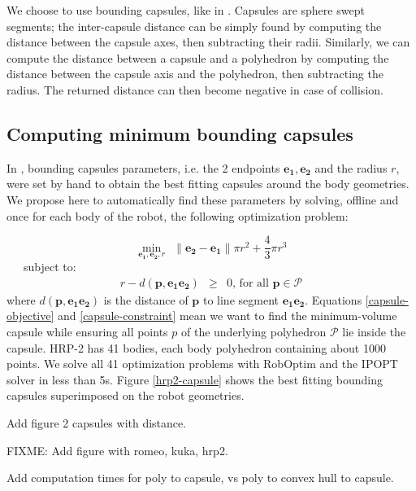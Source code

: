 We choose to use bounding capsules, like in
\cite{Kanoun2011}. Capsules are sphere swept segments; the
inter-capsule distance can be simply found by computing the distance
between the capsule axes, then subtracting their radii. Similarly, we
can compute the distance between a capsule and a polyhedron by
computing the distance between the capsule axis and the polyhedron,
then subtracting the radius. The returned distance can then become
negative in case of collision.

\subsection{Computing minimum bounding capsules}
In \cite{Kanoun2011}, bounding capsules parameters, i.e. the 2
endpoints $\mathbf{e_1}, \mathbf{e_2}$ and the radius $r$, were set by
hand to obtain the best fitting capsules around the body
geometries. We propose here to automatically find these parameters by
solving, offline and once for each body of the robot, the following
optimization problem:

\begin{equation}
  \min_{\mathbf{e_1}, \mathbf{e_2}, r} \ \ 
  \|\mathbf{e_2} - \mathbf{e_1}\| \pi r^2 + \frac{4}{3}\pi r^3
  \label{capsule-objective}
\end{equation}
\ \ \ subject to:
\begin{equation}
  \begin{array}{rcll}
    r - d(\mathbf{p},\mathbf{e_1e_2}) & \ge & 0\mbox{, for all }
    \mathbf{p} \in \mathcal{P}
    \label{capsule-constraint}
  \end{array}
\end{equation} 
where $d(\mathbf{p},\mathbf{e_1e_2})$ is the distance of $\mathbf{p}$
to line segment $\mathbf{e_1e_2}$.  Equations \ref{capsule-objective}
and \ref{capsule-constraint} mean we want to find the minimum-volume
capsule while ensuring all points $p$ of the underlying polyhedron
$\mathcal{P}$ lie inside the capsule. HRP-2 has 41 bodies, each body
polyhedron containing about 1000 points. We solve all 41 optimization
problems with RobOptim \cite{roboptim, moulard2012optimisation} and
the IPOPT solver \cite{Biegler2009} in less than 5s. Figure
\ref{hrp2-capsule} shows the best fitting bounding capsules
superimposed on the robot geometries.

Add figure 2 capsules with distance.

FIXME: Add figure with romeo, kuka, hrp2.

Add computation times for poly to capsule, vs poly to convex hull to
capsule.

